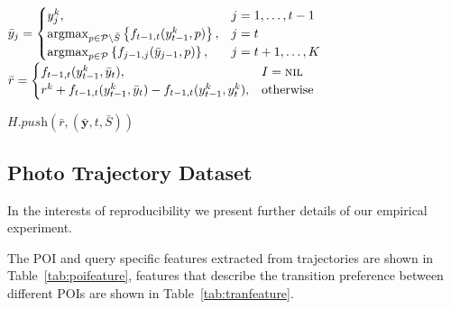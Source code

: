 \begin{algorithm}[htbp]
\begin{algorithmic}[1]
        \STATE $\bar{y}_j = \begin{cases}
                            y_j^k,& j=1,\dots,t-1 \\
                            \operatorname*{argmax}_{p \in \mathcal{P} \setminus \bar{S}} \left\{ f_{t-1,t}(y_{t-1}^k, p) \right\},& j=t \\
                            \operatorname*{argmax}_{p \in \mathcal{P}} \left\{ f_{j-1, j}(\bar{y}_{j-1}, p) \right\},& j=t+1,\dots,K
                \end{cases}$
        \STATE $\bar{r} = \begin{cases}
                          f_{t-1,t}(y_{t-1}^k, \bar{y}_t),&I = \textsc{nil} \\
                          r^k + f_{t-1,t}(y_{t-1}^k, \bar{y}_t) - f_{t-1,t}(y_{t-1}^k, y_t^k), &\text{otherwise}
                          \end{cases}$

        $H.\textit{push}\left(\bar{r}, (\bar{\mathbf{y}}, t, \bar{S}) \right)$
    \ENDFOR
\ENDWHILE
\end{algorithmic}
\end{algorithm}

\clearpage
\subsection{Photo Trajectory Dataset}
\label{sec:feature}

In the interests of reproducibility we present further details of our empirical experiment.

The POI and query specific features extracted from trajectories are shown in Table~\ref{tab:poifeature},
features that describe the transition preference between different POIs are shown in Table~\ref{tab:tranfeature}.

